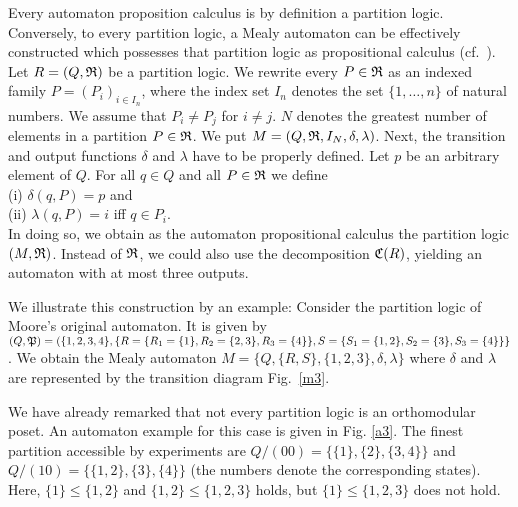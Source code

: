 Every automaton proposition calculus is by definition a partition logic.
Conversely, to every partition logic, a Mealy automaton can be
effectively constructed
which possesses that partition logic as propositional calculus
(cf.~\cite{svozil}).
Let $R = (Q,{\frak R})$ be a partition logic.
We rewrite every $P \in {\frak R}$ as  an indexed family $P = (P_i)_{i
\in I_n}$, where the index set $I_n$ denotes the set $\{1,\ldots,n\}$ of
natural numbers.
We assume that $P_i \neq P_j$ for $i \neq j$.
$N$ denotes the greatest number of elements in a partition $P \in {\frak R}$.
We put $M = (Q,{\frak R},I_N,\delta,\lambda)$.
Next, the transition and output functions $\delta$
and
$\lambda$ have to be properly defined. Let $p$ be an arbitrary element
of
$Q$. For all $q \in Q$ and all $P \in  {\frak R}$ we define \\
(i) $\delta(q,P) = p$ and \\
(ii) $\lambda(q,P) = i$ iff $q \in P_i$.\\
In doing so, we obtain as the automaton propositional calculus the
partition logic $(M,{\frak R})$.
Instead of ${\frak R}$, we could also use the decomposition ${\frak
C}(R)$, yielding an automaton with at most three outputs.

We illustrate this construction by an example:
Consider the partition logic of Moore's original automaton.
It is given by
$(Q, {\frak P}) = (\{1,2,3,4\},\{R=\{R_1=\{1\},R_2=\{2,3\},R_3=\{4\}\},
S=\{S_1=\{1,2\},S_2=\{3\},S_3=\{4\}\}\}$.
We obtain the Mealy automaton $M = \{Q,\{R,S\},\{1,2,3\},\delta,\lambda\}$
where $\delta$ and $\lambda$ are represented by the transition diagram
Fig.~\ref{m3}.


We have already remarked that not every partition logic is  an
orthomodular poset.
An automaton example for this case is given in Fig. \ref{a3}.
The finest partition accessible by experiments are
$Q/(00) = \{\{1\},\{2\},\{3,4\}\}$ and
$Q/(10) = \{\{1,2\},\{3\},\{4\}\}$
(the numbers denote the corresponding states).
Here,
$\{1\} \leq \{1,2\}$ and $\{1,2\} \leq \{1,2,3\}$ holds,
but $\{1\} \leq \{1,2,3\}$ does not hold.


